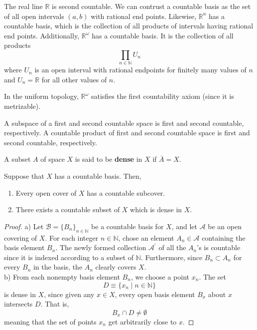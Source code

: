     \begin{example}
    The real line $\mathbb{R}$ is second countable. We can contrust a countable basis as the set of all open intervals $(a, b)$ with rational end points. Likewise, $\mathbb{R}^n$ has a countable basis, which is the collection of all products of intervals having rational end points. Additionally, $\mathbb{R}^\omega$ has a countable basis. It is the collection of all products
    \[\prod_{n \in \mathbb{N}} U_n\]
    where $U_n$ is an open interval with rational endpoints for finitely many values of $n$ and $U_n = \mathbb{R}$ for all other values of $n$. 
    \end{example}

    \begin{example}
    In the uniform topology, $\mathbb{R}^\omega$ satisfies the first countability axiom (since it is metrizable). 
    \end{example}

    \begin{theorem}
    A subspace of a first and second countable space is first and second countable, respectively. A countable product of first and second countable space is first and second countable, respectively. 
    \end{theorem}

    \begin{theorem}
    A subset $A$ of space $X$ is said to be \textbf{dense} in $X$ if $\bar{A} = X$. 
    \end{theorem}

    \begin{theorem}
    Suppose that $X$ has a countable basis. Then, 
    \begin{enumerate}
        \item Every open cover of $X$ has a countable subcover. 
        \item There exists a countable subset of $X$ which is dense in $X$. 
    \end{enumerate}
    \end{theorem}
    \begin{proof}
    a) Let $\mathscr{B} = \{B_n\}_{n \in \mathbb{N}}$ be a countable basis for $X$, and let $\mathscr{A}$ be an open covering of $X$. For each integer $n \in \mathbb{N}$, chose an element $A_n \in \mathscr{A}$ containing the basis element $B_n$. The newly formed collection $\mathscr{A}^\prime$ of all the $A_n$'s is countable since it is indexed according to a subset of $\mathbb{N}$. Furthermore, since $B_n \subset A_n$ for every $B_n$ in the basis, the $A_n$ clearly covers $X$. \\
    b) From each nonempty basis element $B_n$, we choose a point $x_n$. The set 
    \[D \equiv \{x_n \; | \; n \in \mathbb{N}\}\]
    is dense in $X$, since given any $x \in X$, every open basis element $B_x$ about $x$ intersects $D$. That is, 
    \[B_x \cap D \neq \emptyset\]
    meaning that the set of points $x_n$ get arbitrarily close to $x$. 
    \end{proof}

